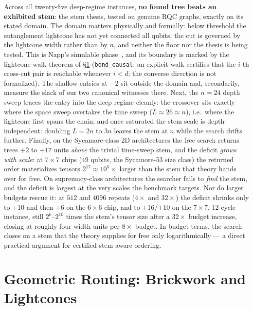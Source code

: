 \documentclass[sigplan,10pt,screen,review,anonymous]{acmart}
\begin{document}
Across all twenty-five deep-regime instances, \textbf{no found
tree beats an exhibited stem}: the stem thesis, tested on genuine RQC graphs, exactly
on its stated domain. The domain matters physically and formally: below threshold the
entanglement lightcone has not yet connected all qubits, the cut is governed by the
lightcone width rather than by $n$, and neither the floor nor the thesis is being tested.
This is Napp's simulable phase~\cite{napp2022efficient}, and its boundary is marked by
the lightcone-walk theorem of \S\ref{sec:routing} (\lstinline|bond_causal|: an explicit walk
certifies that the $i$-th cross-cut pair is reachable whenever $i < d$; the converse
direction is not formalized). The shallow entries at $-2$ sit outside
the domain and, secondarily, measure the slack of our two canonical witnesses there.
Next, the $n{=}24$ depth sweep traces the entry into the deep regime cleanly: the
crossover sits exactly where the space sweep overtakes the time sweep
($L \approx 26 \approx n$), i.e.\ where the lightcone first spans the chain; and once
saturated the stem scale is depth-independent: doubling $L{=}2n$ to $3n$ leaves the
stem at $n$ while the search drifts further. Finally, on the
Sycamore-class 2D architectures the free search returns trees $+2$ to $+17$ units
\emph{above} the trivial time-sweep stem, and the deficit \emph{grows with scale}: at
$7{\times}7$ chips ($49$ qubits, the Sycamore-53 size class) the returned order
materializes tensors $2^{17} \approx 10^{5}\times$ larger than the stem that theory hands
over for free. On supremacy-class architectures the searcher fails to \emph{find} the
stem, and the deficit is largest at the very scales the
benchmark targets. Nor do larger budgets rescue it: at $512$ and $4096$ repeats ($4\times$ and
$32\times$) the deficit shrinks only to $+10$ and then $+6$ on the $6{\times}6$ chip, and
to $+16$/$+10$ on the $7{\times}7$, $12$-cycle instance, still $2^{6}$--$2^{10}$ times
the stem's tensor size after a $32\times$ budget increase, closing at roughly four width
units per $8\times$ budget. In budget terms, the search closes on a stem that the theory
supplies for free only logarithmically --- a direct practical argument for certified
stem-aware ordering.

\section{Geometric Routing: Brickwork and Lightcones}\label{sec:routing}
\end{document}
